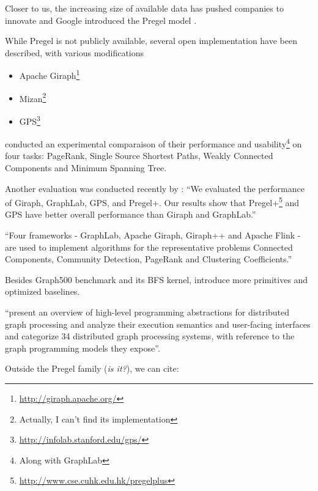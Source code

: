 Closer to us, the increasing size of available data has pushed companies to
innovate and Google introduced the Pregel model \autocite{Pregel10}.

While Pregel is not publicly available, several open implementation have been
described, with various modifications

\begin{itemize}
	\item Apache
		Giraph\footnote{\href{http://giraph.apache.org/}{http://giraph.apache.org/}}
	\item Mizan\footnote{Actually, I can't find its implementation} \autocite{Khayyat2013}
	\item
		GPS\footnote{\href{http://infolab.stanford.edu/gps/}{http://infolab.stanford.edu/gps/}}
		\autocite{Salihoglu2013}
\end{itemize}

\Textcite{Han2014} conducted an experimental comparaison of their performance and
usability\footnote{Along with GraphLab} on four tasks: PageRank, Single Source
Shortest Paths, Weakly Connected Components and Minimum Spanning Tree.

Another evaluation was conducted recently by \textcite{Lu2015}: \enquote{We
evaluated the performance of Giraph, GraphLab, GPS, and Pregel+. Our results
show that
Pregel+\footnote{\href{http://www.cse.cuhk.edu.hk/pregelplus/index.html}%
{http://www.cse.cuhk.edu.hk/pregelplus}} \autocite{Yan2015} and GPS have
better overall performance than Giraph and GraphLab.}

\enquote{Four frameworks - GraphLab, Apache Giraph, Giraph++ and Apache Flink -
are used to implement algorithms for the representative problems Connected
Components, Community Detection, PageRank and Clustering Coefficients.}
\autocite{Koch2016}

Besides Graph500 benchmark and its BFS kernel, \textcite{Beamer2015} introduce
more primitives and optimized baselines.

\Textcite{Paradigm16} \enquote{present an overview of high-level programming
	abstractions  for  distributed  graph  processing  and analyze their
	execution semantics and user-facing interfaces and categorize  34
	distributed  graph  processing  systems, with reference to the graph
programming models  they  expose}.

Outside the Pregel family (\emph{is it?}), we can cite:

